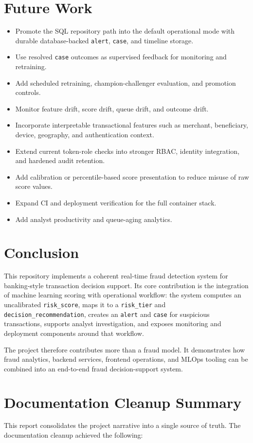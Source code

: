 \documentclass[11pt]{article}
\newcommand{\code}[1]{\texttt{#1}}
\begin{document}
\section{Future Work}
\begin{itemize}
  \item Promote the SQL repository path into the default operational mode with durable database-backed \code{alert}, \code{case}, and timeline storage.
  \item Use resolved \code{case} outcomes as supervised feedback for monitoring and retraining.
  \item Add scheduled retraining, champion-challenger evaluation, and promotion controls.
  \item Monitor feature drift, score drift, queue drift, and outcome drift.
  \item Incorporate interpretable transactional features such as merchant, beneficiary, device, geography, and authentication context.
  \item Extend current token-role checks into stronger RBAC, identity integration, and hardened audit retention.
  \item Add calibration or percentile-based score presentation to reduce misuse of raw score values.
  \item Expand CI and deployment verification for the full container stack.
  \item Add analyst productivity and queue-aging analytics.
\end{itemize}

\section{Conclusion}
This repository implements a coherent real-time fraud detection system for banking-style transaction decision support. Its core contribution is the integration of machine learning scoring with operational workflow: the system computes an uncalibrated \code{risk_score}, maps it to a \code{risk_tier} and \code{decision_recommendation}, creates an \code{alert} and \code{case} for suspicious transactions, supports analyst investigation, and exposes monitoring and deployment components around that workflow.

The project therefore contributes more than a fraud model. It demonstrates how fraud analytics, backend services, frontend operations, and MLOps tooling can be combined into an end-to-end fraud decision-support system.

\section{Documentation Cleanup Summary}
This report consolidates the project narrative into a single source of truth. The documentation cleanup achieved the following:
\end{document}
